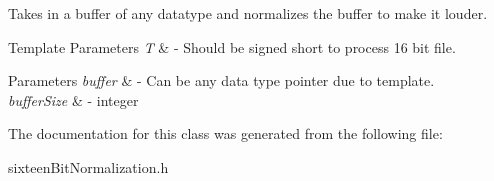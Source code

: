 \begin{DoxyItemize}
\item Takes in a buffer of any datatype and normalizes the buffer to make it louder. 
\end{DoxyItemize}


\begin{DoxyTemplParams}{Template Parameters}
{\em T} & -\/ Should be signed short to process 16 bit file. \\
\hline
\end{DoxyTemplParams}

\begin{DoxyParams}{Parameters}
{\em buffer} & -\/ Can be any data type pointer due to template. \\
\hline
{\em buffer\+Size} & -\/ integer \\
\hline
\end{DoxyParams}


The documentation for this class was generated from the following file\+:\begin{DoxyCompactItemize}
\item 
sixteen\+Bit\+Normalization.\+h\end{DoxyCompactItemize}
